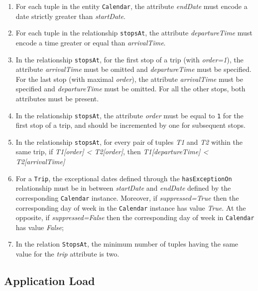	\begin{enumerate}
		\item For each tuple in the entity \texttt{Calendar}, the attribute \textit{endDate} must encode a date strictly greater than \textit{startDate}.
		
		\item For each tuple in the relationship \texttt{stopsAt}, the attribute \textit{departureTime} must encode a time greater or equal than \textit{arrivalTime}.
		
		\item In the relationship \texttt{stopsAt}, for the first stop of a trip (with \textit{order=1}), the attribute \textit{arrivalTime} must be omitted and \textit{departureTime} must be specified. For the last stop (with maximal \textit{order}), the attribute \textit{arrivalTime} must be specified and \textit{departureTime} must be omitted. For all the other stops, both attributes must be present.
		
		\item In the relationship \texttt{stopsAt}, the attribute \textit{order} must be equal to \texttt{1} for the first stop of a trip, and should be incremented by one for subsequent stops.
		
		\item In the relationship \texttt{stopsAt}, for every pair of tuples \textit{T1} and \textit{T2} within the same trip, if \textit{T1[order] < T2[order]}, then \textit{T1[departureTime] < T2[arrivalTime]}
		
		\item For a \texttt{Trip}, the exceptional dates defined through the \texttt{hasExceptionOn} relationship must be in between \textit{startDate} and \textit{endDate} defined by the corresponding \texttt{Calendar} instance. Moreover, if \textit{suppressed=True} then the corresponding day of week in the \texttt{Calendar} instance has value \textit{True}. At the opposite, if \textit{suppressed=False} then the corresponding day of week in \texttt{Calendar} has value \textit{False};
		
		\item In the relation \texttt{StopsAt}, the minimum number of tuples having the same value for the \textit{trip} attribute is two.
	\end{enumerate} 

\newpage
\subsection{Application Load}
	
